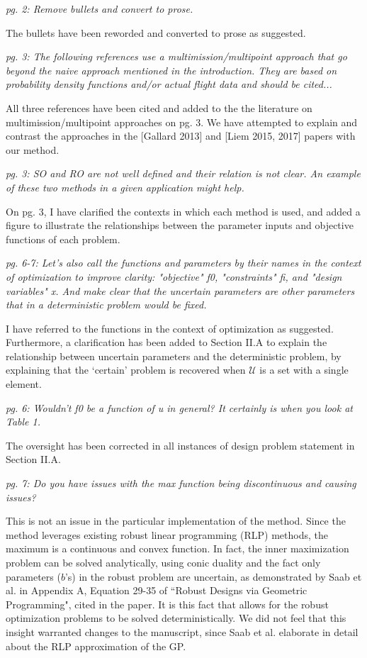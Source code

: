 \documentclass[11pt]{article}
\begin{document}
    \textit{pg. 2: Remove bullets and convert to prose.}

    The bullets have been reworded and converted to prose as suggested.
    \bigskip

    \textit{pg. 3: The following references use a multimission/multipoint approach
    that go beyond the naive approach mentioned in the introduction.
    They are based on probability density functions and/or actual flight data and should be cited...}

    All three references have been cited and added to the the literature on multimission/multipoint approaches on pg. 3.
    We have attempted to explain and contrast the approaches in the [Gallard 2013] and [Liem 2015, 2017] papers
    with our method.
    \bigskip

    \textit{pg. 3: SO and RO are not well defined and their relation is not clear.
    An example of these two methods in a given application might help.}

    On pg. 3, I have clarified the contexts in which each method is used,
    and added a figure to illustrate the relationships between the parameter inputs
    and objective functions of each problem.
    \bigskip


    \textit{pg. 6-7: Let's also call the functions and parameters by their names in the context of optimization to improve clarity:
    "objective" f0, "constraints" fi, and "design variables" x. And make clear that the uncertain parameters are other parameters that in a deterministic problem would be fixed.}

    I have referred to the functions in the context of optimization as suggested. Furthermore,
    a clarification has been added to Section II.A to explain the relationship between uncertain parameters and the
    deterministic problem, by explaining that the `certain' problem is
    recovered when $\mathcal{U}$ is a set with a single element.
    \bigskip


    \textit{pg. 6: Wouldn't f0 be a function of u in general? It certainly is when you look at Table 1.}

    The oversight has been corrected in all instances of design problem statement in Section II.A.
    \bigskip

    \textit{pg. 7: Do you have issues with the max function being discontinuous and causing issues?}

    This is not an issue in the particular implementation of the method.
    Since the method leverages existing robust linear programming (RLP)
    methods, the maximum is a continuous and convex function.
    In fact, the inner maximization problem can be solved analytically, using conic
    duality and the fact only parameters ($b$'s) in the robust problem are uncertain,
    as demonstrated by Saab et al. in Appendix A, Equation 29-35 of ``Robust Designs via Geometric Programming",
    cited in the paper.
    It is this fact that allows for the robust optimization problems to be solved deterministically.
    We did not feel that this insight warranted changes to the manuscript, since
    Saab et al. elaborate in detail about the RLP approximation of the GP.
    \bigskip
\end{document}
